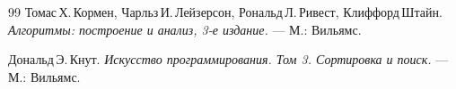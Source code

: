 \begin{thebibliography}{99}
Томас\,Х.\,Кормен, Чарльз\,И.\,Лейзерсон, Рональд\,Л.\,Ривест, Клиффорд\,Штайн.
{\itshape Алгоритмы: построение и анализ, 3-е издание.} --- М.: Вильямс.

Дональд\,Э.\,Кнут.
{\itshape Искусство программирования. Том 3. Сортировка и поиск.} --- М.: Вильямс.
\end{thebibliography}
\pagebreak
